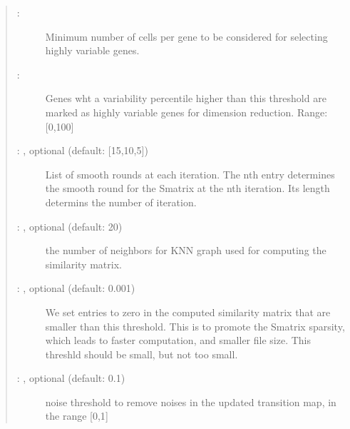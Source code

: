 \documentclass[letterpaper,10pt,english]{sphinxmanual}
\begin{document}
\begin{fulllineitems}
\begin{quote}
\begin{description}
\begin{description}
\item[{ : \sphinxstyleliteralemphasis{\sphinxupquote{, }}\sphinxstyleliteralemphasis{\sphinxupquote{ (}}\sphinxstyleliteralemphasis{\sphinxupquote{)}}}] \leavevmode
Minimum number of cells per gene to be considered for selecting highly variable genes.

\item[{ : \sphinxstyleliteralemphasis{\sphinxupquote{, }}\sphinxstyleliteralemphasis{\sphinxupquote{ (}}\sphinxstyleliteralemphasis{\sphinxupquote{)}}}] \leavevmode
Genes wht a variability percentile higher than this threshold are marked as
highly variable genes for dimension reduction. Range: {[}0,100{]}

\item[{ : , optional (default: {[}15,10,5{]})}] \leavevmode
List of smooth rounds at each iteration.
The n\sphinxhyphen{}th entry determines the smooth round for the Smatrix
at the n\sphinxhyphen{}th iteration. Its length determins the number of
iteration.

\item[{ : , optional (default: 20)}] \leavevmode
the number of neighbors for KNN graph used for computing the similarity matrix.

\item[{ : , optional (default: 0.001)}] \leavevmode
We set entries to zero in the computed similarity matrix that
are smaller than this threshold. This is to promote the Smatrix sparsity, which
leads to faster computation, and smaller file size.
This threshld should be small, but not too small.

\item[{ : , optional (default: 0.1)}] \leavevmode
noise threshold to remove noises in the updated transition map,
in the range {[}0,1{]}


\end{description}
\end{description}
\end{quote}
\end{fulllineitems}
\end{document}
